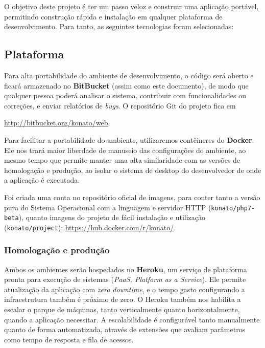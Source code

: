 \documentclass[12pt,a4paper,twoside,hyphens,english,brazil]{abntex2}
\begin{document}
O objetivo deste projeto é ter um passo veloz e construir uma aplicação portável, permitindo construção rápida e instalação em qualquer plataforma de desenvolvimento. Para tanto, as seguintes tecnologias foram selecionadas:

\subsection{Plataforma}
Para alta portabilidade do ambiente de desenvolvimento, o código será aberto e ficará armazenado no \textbf{BitBucket} (assim como este documento), de modo que qualquer pessoa poderá analisar o sistema, contribuir com funcionalidades ou correções, e enviar relatórios de \textit{bugs}. O repositório Git do projeto fica em {\url{http://bitbucket.org/konato/web}.

Para facilitar a portabilidade do ambiente, utilizaremos contêineres do \textbf{Docker}\footnotemark. Ele nos trará maior liberdade de manuseio das configurações do ambiente, ao mesmo tempo que permite manter uma alta similaridade com as versões de homologação e produção, ao isolar o sistema de desktop do desenvolvedor de onde a aplicação é executada.\cite{docker-presentation}

Foi criada uma conta no repositório oficial de imagens, para conter tanto a versão pura do Sistema Operacional com a linguagem e servidor HTTP (\texttt{konato/php7-beta}), quanto imagens do projeto de fácil instalação e utilização (\texttt{konato/project}): \url{https://hub.docker.com/r/konato/}.


\subsubsection*{Homologação e produção}
Ambos os ambientes serão hospedados no \textbf{Heroku}, um serviço de plataforma pronta para execução de sistemas (\textit{PaaS, Platform as a Service}). Ele permite atualização da aplicação com \textit{zero downtime}, e o tempo gasto configurando a infraestrutura também é próximo de zero. O Heroku também nos habilita a escalar o parque de máquinas, tanto verticalmente quanto horizontalmente, quando a aplicação necessitar. A escalabilidade é configurável tanto manualmente quanto de forma automatizada, através de extensões que avaliam parâmetros como tempo de resposta e fila de acessos\cite{heroku-hirefire}\cite{heroku-adept}.

}
\end{document}
